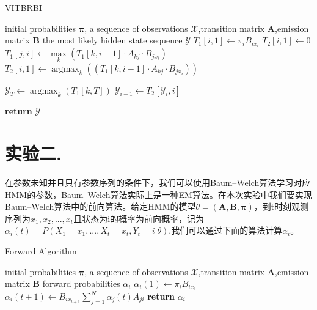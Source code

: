 \documentclass[a4paper,UTF8]{article}
\DeclareMathOperator*{\argmax}{argmax}
\theoremstyle{definition}
\renewcommand{\algorithmicrequire}{\textbf{Input:}}
\renewcommand{\algorithmicensure}{\textbf{Procedure:}}
\begin{document}
	
\begin{algorithm}
	\renewcommand{\algorithmicrequire}{\textbf{Input:}}
	\renewcommand{\algorithmicensure}{\textbf{Output:}}
	\caption{VITBRBI}
	\label{alg:1}
	\begin{algorithmic}[1]
		\REQUIRE initial probabilities $\boldsymbol{\pi}$, a sequence of observations $\mathcal{X}$,transition matrix $\textbf{A}$,emission matrix $\textbf{B}$
		\ENSURE the most likely hidden state sequence $\mathcal{Y}$
		\STATE $T_1[i,1] \gets \pi_iB_{ix_i}$
		\STATE $T_2[i,1] \gets 0$
		\ENDFOR
		\STATE $T_1[j,i] \gets \max \limits_{k} (T_1[k,i-1]\cdot A_{kj}\cdot B_{jx_i})$
		\STATE $T_2[i,1] \gets \argmax_{k}( (T_1[k,i-1]\cdot A_{kj}\cdot B_{jx_i})) $
		\ENDFOR
		\ENDFOR
		
		\STATE $\mathcal{Y}_T \gets \argmax_{k}( T_1[k,T]) $
		\STATE $\mathcal{Y}_{i-1} \gets T_2[\mathcal{Y}_{i},i] $
		\ENDFOR
		
		\STATE \textbf{return} $\mathcal{Y}$	
\end{algorithmic}  
\end{algorithm}
\section*{实验二.}
	在参数未知并且只有参数序列的条件下，我们可以使用Baum–Welch算法学习对应HMM的参数，Baum–Welch算法实际上是一种EM算法。在本次实验中我们要实现Baum–Welch算法中的前向算法。给定HMM的模型$\theta=(\mathbf{A},\mathbf{B},\mathbf{\pi})$，到t时刻观测序列为$x_1,x_2,...,x_t$且状态为i的概率为前向概率，记为$\alpha_i(t)=P(X_1=x_1,...,X_t=x_t,Y_t=i|\theta)$,我们可以通过下面的算法计算$\alpha_i$\cite{reference3}。

\begin{algorithm}
	\renewcommand{\algorithmicrequire}{\textbf{Input:}}
	\renewcommand{\algorithmicensure}{\textbf{Output:}}
	\caption{Forward Algorithm}
	\label{alg:1}
	\begin{algorithmic}[1]
		\REQUIRE initial probabilities $\boldsymbol{\pi}$, a sequence of observations $\mathcal{X}$,transition matrix $\textbf{A}$,emission matrix $\textbf{B}$
		\ENSURE forward probabilities $\alpha_i$
		\STATE $\alpha_i (1) \gets \pi_i B_{ix_1}$
		\STATE $\alpha_i(t+1) \gets B_{ix_{t+1}} \sum_{j=1}^N \alpha_j(t)A_{ji}$
		\ENDFOR
		\STATE \textbf{return} $\alpha_i$
\end{algorithmic}  
\end{algorithm}
\end{document}
